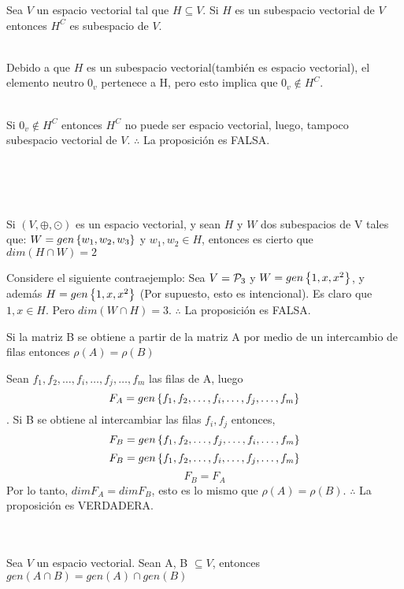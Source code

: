 \begin{enumerate}
\begin{prop}
Sea $V$ un espacio vectorial tal que $H\subseteq V$. Si $H$ es un subespacio vectorial de $V$ entonces $H^C$ es subespacio de $V$.

\end{prop}

\sol
~\\
Debido a que $H$ es un subespacio vectorial(también es espacio vectorial), el elemento neutro $0_v$ pertenece a H, pero esto implica que $0_v \notin H^C$.

~\\
Si $0_v \notin H^C$ entonces $H^C$ no puede ser espacio vectorial, luego, tampoco subespacio vectorial de $ V$. 
$\therefore$ La proposici\'on es FALSA.

~\\
~\\
~\\
\begin{prop}
Si $(V, \oplus, \odot)$ es un espacio vectorial, y sean $H$ y $W$ dos subespacios de V tales que:
$W=gen \left\{w_1, w_2, w_3 \right\} $ y $w_1, w_2  \in H$, entonces es cierto que $dim(H\cap W)=2$
\end{prop}

\sol
Considere el siguiente contraejemplo:
Sea $V={\cal P}_3$ y $W=gen \left\{1, x, x^2 \right\} $, y adem\'as $H=gen \left\{1, x, x^2 \right\} $ (Por supuesto, esto es intencional). Es claro que $1, x \in H$. Pero $dim(W\cap H)=3$.
$\therefore$ La proposici\'on es FALSA.

\newpage
\begin{prop}
Si la matriz B se obtiene a partir de la matriz A por medio de un intercambio de filas entonces $\rho(A)=\rho(B)$
\end{prop}

\sol
Sean $f_1, f_2, \ldots, f_i, \ldots , f_j, \ldots, f_m$ las filas de A, luego $$F_A=gen \left\{f_1, f_2, \ldots, f_i, \ldots , f_j, \ldots, f_m \right\} $$. Si B se obtiene al intercambiar las filas $f_i, f_j$ entonces, 
$$F_B=gen \left\{f_1, f_2, \ldots, f_j, \ldots , f_i, \ldots, f_m \right\} $$
$$F_B=gen \left\{f_1, f_2, \ldots, f_i, \ldots , f_j, \ldots, f_m \right\} $$
$$F_B=F_A$$
Por lo tanto, $dimF_A=dim F_B$, esto es lo mismo que $\rho(A)=\rho(B)$.
$\therefore $ La proposici\'on es VERDADERA.
~\\
~\\
~\\

\begin{prop}
Sea $V$ un espacio vectorial. Sean A, B $\subseteq V$, entonces $gen(A\cap B)=gen(A)\cap gen(B)$
\end{prop}
\sol


\end{enumerate}
